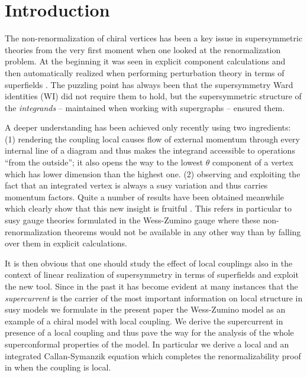 \documentclass[a4paper,12pt]{article}
\begin{document}
\section{Introduction}
\setcounter{equation}{0}

The non-renormalization of chiral vertices has been a key issue
in supersymmetric theories from the very first moment when
one looked at the renormalization problem.
At the beginning it was seen in explicit component calculations
 \cite{WZ}
and then automatically realized when
performing perturbation theory in terms of superfields \cite{FuLa, FePi,GSR79}.
The puzzling point has always been that the supersymmetry Ward identities
(WI) did not require them to hold, but the supersymmetric structure
of the {\sl integrands} -- maintained when working with supergraphs --
ensured them. 

A deeper understanding has been achieved only recently
\cite{FK} using two ingredients: (1) rendering the coupling local
causes flow of external momentum through every internal line of
a diagram and thus makes the integrand accessible to operations
``from the outside''; it also opens the way to the lowest $\theta$ component
of a vertex which has lower dimension than the highest one. (2)
observing and exploiting the fact that an integrated vertex is always
a susy variation and thus carries momentum factors.
Quite a number of results have been obtained meanwhile which
clearly show that this new insight is fruitful
\cite{KRST01,KR01,KR01anom}. This refers in
particular to susy gauge theories formulated in the Wess-Zumino
gauge  where these non-renormalization theorems would not be
available in any other way than by falling over them in
explicit calculations. 

It is then obvious that one should
study the effect of local couplings also in the context
of linear realization of supersymmetry in terms of superfields 
and exploit the new tool. Since in the past it has become
evident at many instances that the {\sl supercurrent} is the
carrier of the most important information on local structure
in susy models we formulate in the present paper the
Wess-Zumino model as an example of a chiral model with
local coupling. We derive the supercurrent in presence of
a local coupling and thus pave the way for the analysis
of the whole superconformal properties of the model. 
In particular we derive a local and an integrated
Callan-Symanzik equation which completes the renormalizability proof
in \cite{FK} when the coupling is local.
\end{document}
